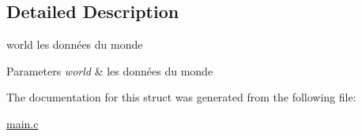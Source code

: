 \subsection{Detailed Description}
world les données du monde 


\begin{DoxyParams}{Parameters}
{\em world} & les données du monde \\
\hline
\end{DoxyParams}


The documentation for this struct was generated from the following file\-:\begin{DoxyCompactItemize}
\item 
\hyperlink{main_8c}{main.\-c}\end{DoxyCompactItemize}
